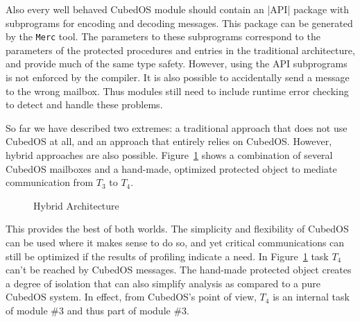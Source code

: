 Also every well behaved CubedOS module should contain an |API| package with subprograms for
encoding and decoding messages. This package can be generated by the \texttt{Merc} tool. The
parameters to these subprograms correspond to the parameters of the protected procedures and
entries in the traditional architecture, and provide much of the same type safety. However,
using the API subprograms is not enforced by the compiler. It is also possible to accidentally
send a message to the wrong mailbox. Thus modules still need to include runtime error checking
to detect and handle these problems.

So far we have described two extremes: a traditional approach that does not use CubedOS at all,
and an approach that entirely relies on CubedOS. However, hybrid approaches are also possible.
Figure~\ref{fig:hybrid-architecture} shows a combination of several CubedOS mailboxes and a
hand-made, optimized protected object to mediate communication from $T_3$ to $T_4$.

\begin{figure}[tbhp]
  \center
  \caption{Hybrid Architecture}
  \label{fig:hybrid-architecture}
\end{figure}

This provides the best of both worlds. The simplicity and flexibility of CubedOS can be used
where it makes sense to do so, and yet critical communications can still be optimized if the
results of profiling indicate a need. In Figure~\ref{fig:hybrid-architecture} task $T_4$ can't
be reached by CubedOS messages. The hand-made protected object creates a degree of isolation
that can also simplify analysis as compared to a pure CubedOS system. In effect, from CubedOS's
point of view, $T_4$ is an internal task of module \#3 and thus part of module \#3.


